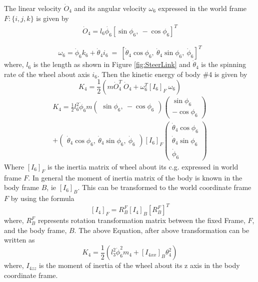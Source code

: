   The linear velocity $\dot{O}_4$  and its angular velocity $\omega_6$  expressed in the world frame $F:\{i,j,k\}$ is given by
 \begin{eqnarray}
 \dot{O}_4=l_6\dot{\phi_6}[\sin\phi_6, ~ -\cos\phi_6] ^T
 \end{eqnarray}
 
 \begin{equation}
 \omega_6=\dot\phi_6k_6+\dot\theta_4i_6 ~=~ [\dot\theta_4\cos\phi_6,~ \dot\theta_4\sin\phi_6,~ \dot\phi_6]^T
 \end{equation} where, $l_6$ is the length as shown in Figure \ref{fig:SteerLink}  and $\dot\theta_4$ is the spinning rate of the wheel about axis $i_6$.
 Then the kinetic energy of body \#4 is given by
\begin{equation}
 K_4=\frac{1}{2}(m\dot O_4 ^T ~\dot O_4+ \omega_6^T [I_6]_F~\omega_6  )
 \end{equation}
 \begin{multline}
 K_4=\frac{1}{2} l_6^2 \dot\phi_6 m \begin{pmatrix}
 \sin\phi_6, ~ -\cos\phi_6
 \end{pmatrix}
 \begin{pmatrix}
 \sin\phi_6\\ -\cos\phi_6
 \end{pmatrix}\\
 + 
 \begin{pmatrix}
 \dot\theta_4 \cos\phi_6, ~ \dot\theta_4 \sin\phi_6, ~\dot\phi_6
 \end{pmatrix}[I_6]_F
 \begin{pmatrix}
 \dot\theta_4 \cos\phi_6\\ \dot\theta_4 \sin\phi_6\\ \dot\phi_6
 \end{pmatrix}
 \end{multline} Where $[I_6]_F$ is the inertia matrix of wheel about its c.g. expressed in world frame $F$.
 In general the moment of inertia matrix of the body is known in the body frame $B$, ie $[I_6]_B$. This can be transformed to the world coordinate frame $F$ by using the formula
 \[ [I_4]_F=R^F_B[I_4]_B [R^F_B]^T\] where, $R^F_B$ represents rotation transformation matrix between the fixed Frame, $F$, and the body frame, $B$. 
 The above Equation, after above transformation can be written as
 \begin{equation}
 K_4=\frac{1}{2}(l_3^2\dot\phi_6^2m_4+[I_{4xx}]_B\theta_4^2)
 \end{equation} 
where, $I_{4zz} $ is the moment of inertia of the wheel about its z axis in the body coordinate frame.


